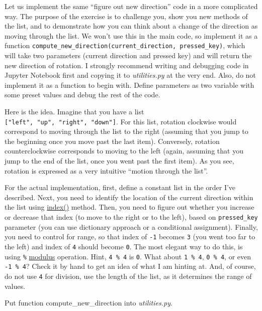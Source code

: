 \documentclass[
]{book}
\begin{document}
Let us implement the same ``figure out new direction'' code in a more complicated way. The purpose of the exercise is to challenge you, show you new methods of the list, and to demonstrate how you can think about a change of the direction as moving through the list. We won't use this in the main code, so implement it as a function \texttt{compute\_new\_direction(current\_direction,\ pressed\_key)}, which will take two parameters (current direction and pressed key) and will return the new direction of rotation. I strongly recommend writing and debugging code in Jupyter Notebook first and copying it to \emph{utilities.py} at the very end. Also, do not implement it as a function to begin with. Define parameters as two variable with some preset values and debug the rest of the code.

Here is the idea. Imagine that you have a list \texttt{{[}"left",\ "up",\ "right",\ "down"{]}}. For this list, rotation clockwise would correspond to moving through the list to the right (assuming that you jump to the beginning once you move past the last item). Conversely, rotation counterclockwise corresponds to moving to the left (again, assuming that you jump to the end of the list, once you went past the first item). As you see, rotation is expressed as a very intuitive ``motion through the list''.

For the actual implementation, first, define a constant list in the order I've described. Next, you need to identify the location of the current direction within the list using \href{https://docs.python.org/3/tutorial/datastructures.html\#more-on-lists}{index()} method. Then, you need to figure out whether you increase or decrease that index (to move to the right or to the left), based on \texttt{pressed\_key} parameter (you can use dictionary approach or a conditional assignment). Finally, you need to control for range, so that index of \texttt{-1} becomes \texttt{3} (you went too far to the left) and index of \texttt{4} should become \texttt{0}. The most elegant way to do this, is using \texttt{\%} \href{https://python-reference.readthedocs.io/en/latest/docs/operators/modulus.html}{modulus} operation. Hint, \texttt{4\ \%\ 4} is \texttt{0}. What about \texttt{1\ \%\ 4}, \texttt{0\ \%\ 4}, or even \texttt{-1\ \%\ 4}? Check it by hand to get an idea of what I am hinting at. And, of course, do not use \texttt{4} for division, use the length of the list, as it determines the range of values.

Put function compute\_new\_direction into \emph{utilities.py}.
\end{document}
